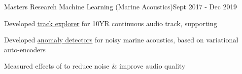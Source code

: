 \documentclass{article}
\newenvironment{**mylist}[2]{

\subsubsection*{#1\hfill#2}
  \small
  \begin{list}{}{}
    \setlength{\topsep}{0pt}
   \setlength{\itemsep}{1pt}
   \setlength{\parskip}{0pt}
   \setlength{\parsep}{0pt}}{\end{list}\normalsize}
\newcommand{\LU}[1]{\hspace{-1em}{\bf Technologies : #1}}
\begin{document}
\begin{**mylist}{Masters Research \tabb Machine Learning (Marine Acoustics)}{Sept 2017 - Dec 2019}
\item Developed \href{https://github.com/probinso/ACOio}{track explorer} for 10YR continuous audio track, supporting  %
\item Developed \href{https://github.com/probinso/gumiho-network}{anomaly detectors} for noisy marine acoustics, based on variational auto-encoders
\item Measured effects of  to reduce noise \& improve audio quality
\end{**mylist}
\end{document}
